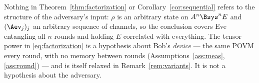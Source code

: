 
\begin{remark}\label{rem:coherent}
Nothing in Theorem~\ref{thm:factorization} or
Corollary~\ref{cor:sequential} refers to the structure of the adversary's
input: $\rho$ is an arbitrary state on $A^{n}\Bsys^{n}E$ and $(\Aev_j)_j$ an
arbitrary sequence of channels, so the conclusion covers Eve entangling all $n$
rounds and holding $E$ correlated with everything. The tensor power in
\eqref{eq:factorization} is a hypothesis about Bob's \emph{device} --- the same
POVM every round, with no memory between rounds
(Assumptions~\ref{ass:meas}, \ref{ass:round}) --- and is itself relaxed in
Remark~\ref{rem:variants}. It is not a hypothesis about the adversary.
\end{remark}

